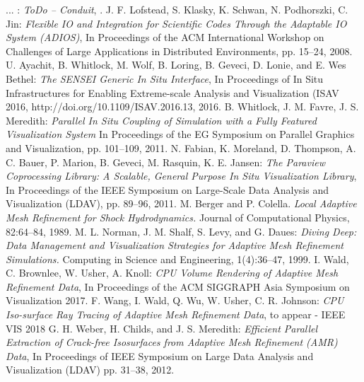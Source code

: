 \begin{thebibliography}{0}
... :
\textsl{ToDo -- Conduit}, 
.
%
% 
J. F. Lofstead, S. Klasky, K. Schwan, N. Podhorszki, C. Jin: 
\textsl{Flexible IO and Integration for Scientific Codes Through the Adaptable IO System (ADIOS)},
In Proceedings of the ACM International Workshop on Challenges of Large Applications in Distributed Environments, pp. 15–24, 2008.
%
%
U. Ayachit, B. Whitlock, M. Wolf, B. Loring, B. Geveci, D. Lonie, and E. Wes Bethel:
\textsl{The SENSEI Generic In Situ Interface}, 
In Proceedings of In Situ Infrastructures for Enabling Extreme-scale Analysis and Visualization (ISAV 2016, http://doi.org/10.1109/ISAV.2016.13, 2016.
%
% 
B. Whitlock, J. M. Favre, J. S. Meredith:
\textsl{Parallel In Situ Coupling of Simulation with a Fully Featured Visualization System}
In Proceedings of the EG Symposium on Parallel Graphics and Visualization, pp. 101–109, 2011.
%
% 
N. Fabian, K. Moreland, D. Thompson, A. C. Bauer, P. Marion, B. Geveci, M. Rasquin, K. E. Jansen: 
\textsl{The Paraview Coprocessing Library: A Scalable, General Purpose In Situ Visualization Library},
In Proceedings of the IEEE Symposium on Large-Scale Data Analysis and Visualization (LDAV), pp. 89–96, 2011.
%
%
M. Berger and P. Colella. 
\textsl{Local Adaptive Mesh Refinement for Shock Hydrodynamics.} 
Journal of Computational Physics, 82:64–84, 1989.
%
% 
M. L. Norman, J. M. Shalf, S. Levy, and G. Daues: 
\textsl{Diving Deep: Data Management and Visualization Strategies for Adaptive Mesh Refinement Simulations.} 
Computing in Science and Engineering, 1(4):36–47, 1999.
%
% 
I. Wald, C. Brownlee, W. Usher, A. Knoll: 
\textsl{CPU Volume Rendering of Adaptive Mesh Refinement Data},
In Proceedings of the ACM SIGGRAPH Asia Symposium on Visualization 2017.
%
% 
F. Wang, I. Wald, Q. Wu, W. Usher, C. R. Johnson: 
\textsl{CPU Iso-surface Ray Tracing of Adaptive Mesh Refinement Data}, 
to appear - IEEE VIS 2018
%
%
G. H. Weber, H. Childs, and J. S. Meredith: 
\textsl{Efficient Parallel Extraction of Crack-free Isosurfaces from Adaptive Mesh Refinement (AMR) Data},
In Proceedings of IEEE Symposium on Large Data Analysis and Visualization (LDAV) pp. 31–38, 2012.
\end{thebibliography}


